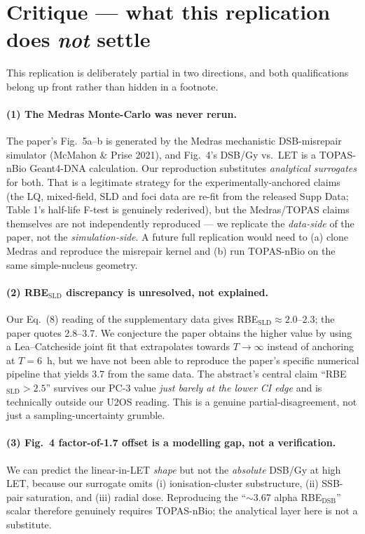 \documentclass[11pt]{article}
\begin{document}
\section{Critique --- what this replication does \emph{not} settle}

This replication is deliberately partial in two directions, and both
qualifications belong up front rather than hidden in a footnote.

\paragraph{(1) The Medras Monte-Carlo was never rerun.}
The paper's Fig.~5a--b is generated by the Medras mechanistic
DSB-misrepair simulator (McMahon \& Prise 2021), and Fig.~4's DSB/Gy vs.\
LET is a TOPAS-nBio Geant4-DNA calculation. Our reproduction substitutes
\emph{analytical surrogates} for both. That is a legitimate strategy for
the experimentally-anchored claims (the LQ, mixed-field, SLD and foci
data are re-fit from the released Supp Data; Table 1's half-life F-test
is genuinely rederived), but the Medras/TOPAS claims themselves are not
independently reproduced --- we replicate the \emph{data-side} of the
paper, not the \emph{simulation-side}. A future full replication would
need to (a) clone Medras and reproduce the misrepair kernel and (b) run
TOPAS-nBio on the same simple-nucleus geometry.

\paragraph{(2) RBE$_{\text{SLD}}$ discrepancy is unresolved, not
explained.} Our Eq.~(8) reading of the supplementary data gives
RBE$_{\text{SLD}} \approx 2.0$--$2.3$; the paper quotes 2.8--3.7. We
conjecture the paper obtains the higher value by using a Lea--Catcheside
joint fit that extrapolates towards $T\!\to\!\infty$ instead of anchoring
at $T=6$~h, but we have not been able to reproduce the paper's specific
numerical pipeline that yields 3.7 from the same data. The abstract's
central claim ``RBE$_{\text{SLD}} > 2.5$'' survives our PC-3 value
\emph{just barely at the lower CI edge} and is technically outside our
U2OS reading. This is a genuine partial-disagreement, not just a
sampling-uncertainty grumble.

\paragraph{(3) Fig.~4 factor-of-1.7 offset is a modelling gap, not a
verification.} We can predict the linear-in-LET \emph{shape} but not the
\emph{absolute} DSB/Gy at high LET, because our surrogate omits (i)
ionisation-cluster substructure, (ii) SSB-pair saturation, and (iii)
radial dose. Reproducing the ``$\sim$3.67 alpha RBE$_{\text{DSB}}$''
scalar therefore genuinely requires TOPAS-nBio; the analytical layer here
is not a substitute.
\end{document}
